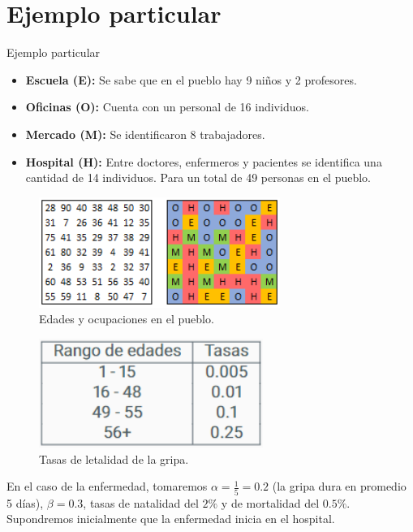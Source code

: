 \documentclass[9pt]{beamer}
\begin{document}
\section{Ejemplo particular}
\begin{frame}{Ejemplo particular}
\begin{itemize}
    \item \textbf{Escuela (E):} Se sabe que en el pueblo hay 9 niños y 2 profesores.
    \item \textbf{Oficinas (O):} Cuenta con un personal de 16 individuos.
    \item \textbf{Mercado (M):} Se identificaron 8 trabajadores.
    \item \textbf{Hospital (H):} Entre doctores, enfermeros y pacientes se identifica una cantidad de 14 individuos. Para un total de 49 personas en el pueblo.
\end{itemize}
\begin{minipage}{0.48\textwidth}
\begin{figure}[h]
  \centering
    \includegraphics[width=0.7\textwidth]{Imagenes/edadesYOcupaciones.PNG}
    \caption{Edades y ocupaciones en el pueblo.}
    \label{fig:edadesYOcupaciones}
\end{figure}
\end{minipage}
\hfill
\begin{minipage}{0.48\textwidth}
\begin{figure}[h]
  \centering
    \includegraphics[width=0.65\textwidth]{Imagenes/tasasDeLetalidad_ex_Pueblo.png}
    \caption{Tasas de letalidad de la gripa.}
\end{figure}
\end{minipage}

En el caso de la enfermedad, tomaremos $\alpha=\frac{1}{5}=0.2$ (la gripa dura en promedio 5 días), $\beta=0.3$, tasas de natalidad del $2\%$ y de mortalidad del $0.5\%$. Supondremos inicialmente que la enfermedad inicia en el hospital.
\end{frame}
\end{document}
